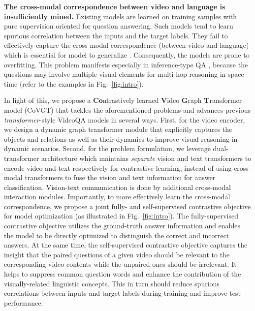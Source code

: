 \documentclass[10pt,journal,compsoc]{IEEEtran}
\newcommand{\trans}{\emph{transformer}}
\begin{document}
\textbf{The cross-modal correspondence between video and language is insufficiently mined.} Existing models are learned on 
training samples with pure supervision oriented for question answering. Such models tend to learn spurious correlation between the inputs and the target labels. They fail to effectively capture the cross-modal correspondence (between video and language) which is essential for model to generalize  \cite{agarwal2020towards,niu2021counterfactual,li2022invariant,li2022equivariant}. Consequently, the models are prone to overfitting. This problem manifests especially in 
inference-type QA \cite{xiao2021next}, because the questions may involve multiple visual elements for multi-hop reasoning in space-time (refer to the examples in Fig.~\ref{fig:intro}).

In light of this, we propose a \textbf{Co}ntrastively learned \textbf{V}ideo \textbf{G}raph \textbf{T}ransformer model (CoVGT) that tackles the aforementioned problems and advances previous \trans-style VideoQA models in several ways. First, for the video encoder, we design a dynamic graph transformer module that explicitly captures the objects and relations as well as their dynamics to improve visual reasoning in dynamic scenarios. Second, for the problem formulation, we leverage dual-transformer architecture which maintains \emph{separate} vision and text transformers to encode video and text respectively for contrastive learning, instead of using cross-modal transformers to fuse the vision and text information for answer classification. Vision-text communication is done by additional cross-modal interaction modules. Importantly, to more effectively learn the cross-modal correspondence, we propose a joint fully- and self-supervised contrastive objective for model optimization (as illustrated in Fig.~\ref{fig:intro}). The fully-supervised contrastive objective utilizes the ground-truth answer information and enables the model to be directly optimized to distinguish the correct and incorrect answers. At the same time, the self-supervised contrastive objective captures the insight that the paired questions of a given video should be relevant to the corresponding video contents while the unpaired ones should be irrelevant. It helps to suppress common question words and
enhance the contribution of the visually-related linguistic concepts. This in turn should reduce spurious correlations between inputs and target labels during training and improve test performance.
\end{document}
